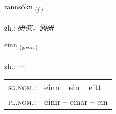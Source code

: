 \documentclass[frontgrid, backgrid]{flacards}\usepackage[]{graphicx}\usepackage[]{xcolor}
\begin{document}
{rannsókn \small{\textsubscript{(\textit{f.})}} \\[1ex] %
\textphonetic{[ransouhkn̥]} \\
zh.: \emph{研究，调研} \\  [2ex]
\renewcommand*{\arraystretch}{0.8}
}

\renewcommand{\flhead}{\vskip5pt \fboxsep=0pt {\small\bfseries\footnotesize Fornafn | 代词}}
\renewcommand{\fcfoot}{\vskip5pt \fboxsep=0pt \hspace{2pt}{\small\bfseries\footnotesize 1K}}

\renewcommand{\blhead}{\vskip5pt {\small\bfseries\footnotesize Fornafn | 代词 }}
\renewcommand{\bcfoot}{\vskip5pt \hspace{2pt}{\small\bfseries\footnotesize 1K}}


{einn \small{\textsubscript{(\textit{pron.})}} \\[1ex] %
\textphonetic{[eitn̥]} \\
zh.: \emph{一} \\  [2ex]
\renewcommand*{\arraystretch}{0.8}
\begin{tabular}{ll}
\textsc{sg.nom.}: & einn  --  ein -- eitt \\ 
\textsc{pl.nom.}: & einir -- einar -- ein
\end{tabular}
}

\renewcommand{\flhead}{\vskip5pt \fboxsep=0pt {\small\bfseries\footnotesize Lýsingarorð | 形容词}}
\renewcommand{\fcfoot}{\vskip5pt \fboxsep=0pt \hspace{2pt}{\small\bfseries\footnotesize 1K}}

\renewcommand{\blhead}{\vskip5pt {\small\bfseries\footnotesize Lýsingarorð | 形容词 }}
\renewcommand{\bcfoot}{\vskip5pt \hspace{2pt}{\small\bfseries\footnotesize 1K}}
\end{document}
